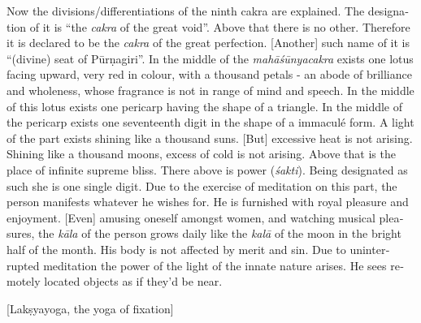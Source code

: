 \begin{otherlanguage}{english}
\begin{tlate}
Now the divisions/differentiations of the ninth cakra are explained. The designation of it is ``the \textit{cakra} of the great void''. Above that there is no other. Therefore it is declared to be the \textit{cakra} of the great perfection. [Another] such name of it is ``(divine) seat of Pūrṇagiri''. In the middle of the \textit{mahāśūnyacakra} exists one lotus facing upward, very red in colour, with a thousand petals - an abode of brilliance and wholeness, whose fragrance is not in range of mind and speech. In the middle of this lotus exists one pericarp having the shape of a triangle. In the middle of the pericarp exists one seventeenth digit in the shape of a immaculé form. A light of the part exists shining like a thousand suns. [But] excessive heat is not arising. Shining like a thousand moons, excess of cold is not arising.  Above that is the place of infinite supreme bliss. There above is power (\textit{śakti}). Being designated as such she is one single digit. Due to the exercise of meditation on this part, the person manifests whatever he wishes for. He is furnished with royal pleasure and enjoyment. [Even] amusing oneself amongst women, and watching musical pleasures, the \textit{kāla} of the person grows daily like the \textit{kalā} of the moon in the bright half of the month. His body is not affected by merit and sin. Due to uninterrupted meditation the power of the light of the innate nature arises. He sees remotely located objects as if they'd be near.
\end{tlate}
     \bigskip
    \centerline{\textrm{\small{[Lakṣyayoga, the yoga of fixation]}}}

\end{otherlanguage}
